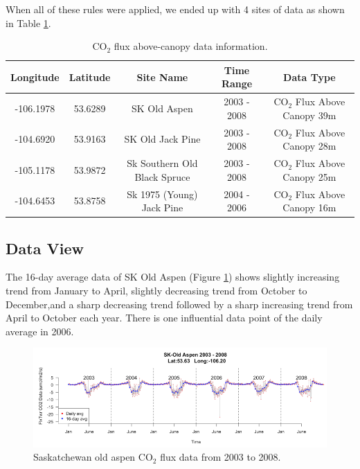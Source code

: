 \documentclass{article}\usepackage[]{graphicx}\usepackage[]{color}
\begin{document}
When all of these rules were applied, we ended up with 4 sites of data as shown in Table \ref{Tab:FluxData}.

\begin{table}[!ht]
\caption{CO$_2$ flux above-canopy data information.}\label{Tab:FluxData}
\centering
\begin{tabular}{ccccc}
\hline
\textbf{Longitude} & \textbf{Latitude} & \textbf{Site Name} & \textbf{Time Range} & \textbf{Data Type}\\
\hline
-106.1978 & 53.6289 & SK Old Aspen & 2003 - 2008 & CO$_2$ Flux Above Canopy 39m\\
-104.6920 & 53.9163 & SK Old Jack Pine & 2003 - 2008 & CO$_2$ Flux Above Canopy 28m\\
-105.1178 & 53.9872 & Sk Southern Old Black Spruce & 2003 - 2008 & CO$_2$ Flux Above Canopy 25m\\
-104.6453 & 53.8758 & Sk 1975 (Young) Jack Pine & 2004 - 2006 & CO$_2$ Flux Above Canopy 16m\\
\hline
\end{tabular}
\end{table}

\subsection{Data View}

The 16-day average data of SK Old Aspen (Figure \ref{Fig:OAPmodis}) shows slightly increasing trend from January to April, slightly decreasing trend from October to December,and a sharp decreasing trend followed by a sharp increasing trend from April to October each year. There is one influential data point of the daily average in 2006.



\begin{figure}[!ht]
\centering
\includegraphics[width=14cm]{OAPmodis1.png}
\caption{Saskatchewan old aspen CO$_2$ flux data from 2003 to 2008.}
\label{Fig:OAPmodis}
\end{figure}
\end{document}
